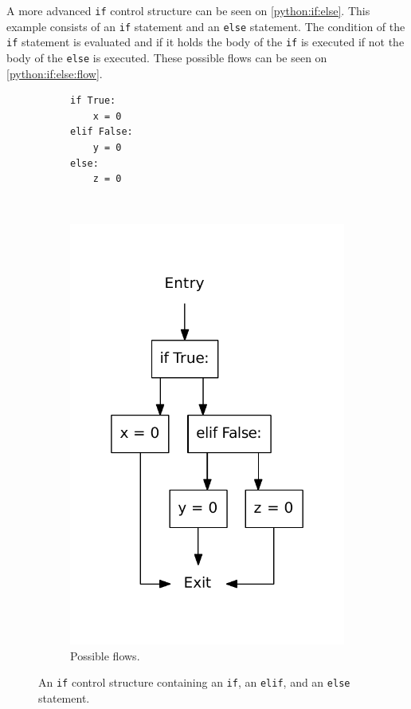 A more advanced \texttt{if} control structure can be seen on \cref{python:if:else}.
This example consists of an \texttt{if} statement and an \texttt{else} statement.
The condition of the \texttt{if} statement is evaluated and if it holds the body of the \texttt{if} is executed if not the body of the \texttt{else} is executed.
These possible flows can be seen on \cref{python:if:else:flow}.


\begin{figure}
  \centering
  \begin{subfigure}[b]{0.4\textwidth}
    \begin{lstlisting}[style=python, caption={Code example.}, label={python:if:elif:code}]
if True:
    x = 0
elif False:
    y = 0
else:
    z = 0
    \end{lstlisting}
  \end{subfigure}
  ~ %
  \begin{subfigure}[b]{0.4\textwidth}
    \centering
    \includegraphics[scale=.5]{./figures/if_else_elif.pdf}
    \caption{Possible flows.}
    \label{python:if:elif:flow}
  \end{subfigure}
  \caption{An \texttt{if} control structure containing an \texttt{if}, an \texttt{elif}, and an \texttt{else} statement.}
  \label{python:if:elif}
\end{figure}


